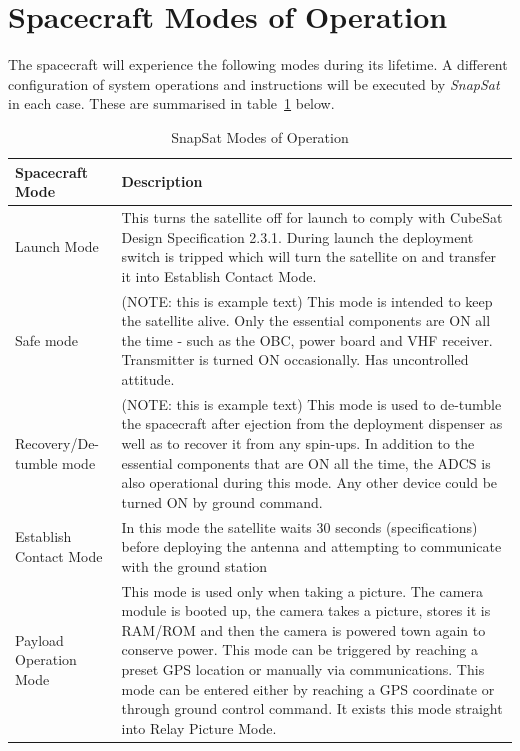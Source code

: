 \section{Spacecraft Modes of Operation}
The spacecraft will experience the following modes during its lifetime. A different configuration of system operations and instructions will be executed by \textit{SnapSat} in each case. These are summarised in table~\ref{tab:modesofoperation} below.

\begin{table}[H]
    \centering
    \caption{SnapSat Modes of Operation}
    \vspace{0.15cm}
    \label{tab:modesofoperation}
    {\renewcommand{\arraystretch}{1.4}%
        \begin{tabular}{|>{\arraybackslash}m{4.5cm}|>{\arraybackslash}m{10.5cm}|}
            \hline
            \textbf{Spacecraft Mode} & \textbf{Description} \\ \hline\hline
            Launch Mode &  This turns the satellite off for launch to comply with CubeSat Design Specification 2.3.1. During launch the deployment switch is tripped which will turn the satellite on and transfer it into Establish Contact Mode.
            \\\hline
            Safe mode & (NOTE: this is example text) This mode is intended to keep the satellite alive. Only the essential components are ON all the time - such as the OBC, power board and VHF receiver. Transmitter is turned ON occasionally. 
            Has uncontrolled attitude. 
             \\\hline
            Recovery/De-tumble mode & (NOTE: this is example text) This mode is used to de-tumble the spacecraft after ejection from the deployment dispenser as well as to recover it from any spin-ups. In addition to the essential components that are ON all the time, the ADCS is also operational during this mode. Any other device could be turned ON by ground command.  
            \\\hline
			Establish Contact Mode & In this mode the satellite waits 30 seconds (specifications) before deploying the antenna and attempting to communicate with the ground station
            \\\hline
            Payload Operation Mode & This mode is used only when taking a picture.  The camera module is booted up, the camera takes a picture, stores it is RAM/ROM and then the camera is powered town again to conserve power.  This mode can be triggered by reaching a preset GPS location or manually via communications.  This mode can be entered either by reaching a GPS coordinate or through ground control command.  It exists this mode straight into Relay Picture Mode.

\end{tabular}}
\end{table}
